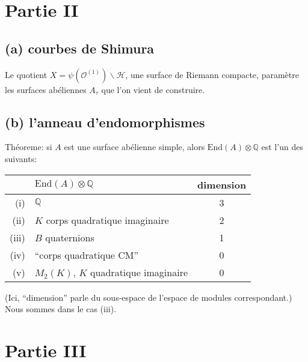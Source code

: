 \documentclass[a4paper]{article}
\newcommand{\QQ}{\mathbb{Q}}
\newcommand{\UHP}{\mathcal{H}}
\newcommand{\OO}{\mathcal{O}}
\newcommand{\End}{\mathrm{End}}
\begin{document}
\section{%
    Partie II
}%

\subsection*{(a) courbes de Shimura}

Le quotient \(X =  \psi(\OO^{(1)})\backslash\UHP\), une surface de
Riemann compacte,
paramètre les surfaces abéliennes \(A_\tau\) que l'on vient de
construire.

\subsection*{(b) l'anneau d'endomorphismes}

Théoreme: si \(A\) est une surface abélienne simple, 
alors \(\End(A)\otimes\QQ\) est l'un des suivants:
\begin{center}
    \begin{tabular}{rl|c}
                & \(\End(A)\otimes\QQ\) & dimension \\
        \hline
        (i)     & \(\QQ\) & 3 \\
        (ii)    & \(K\) corps quadratique imaginaire & 2 \\
        (iii)   & \(B\) quaternions & 1 \\
        (iv)    & ``corps quadratique CM'' & 0 \\
        (v)     & \(M_2(K)\), \(K\) quadratique imaginaire & 0 \\
    \end{tabular}
\end{center}
(Ici, ``dimension'' parle du sous-espace de l'espace de modules
correspondant.)
Nous sommes dans le cas (iii).

\section{%
    Partie III
}%
\end{document}

